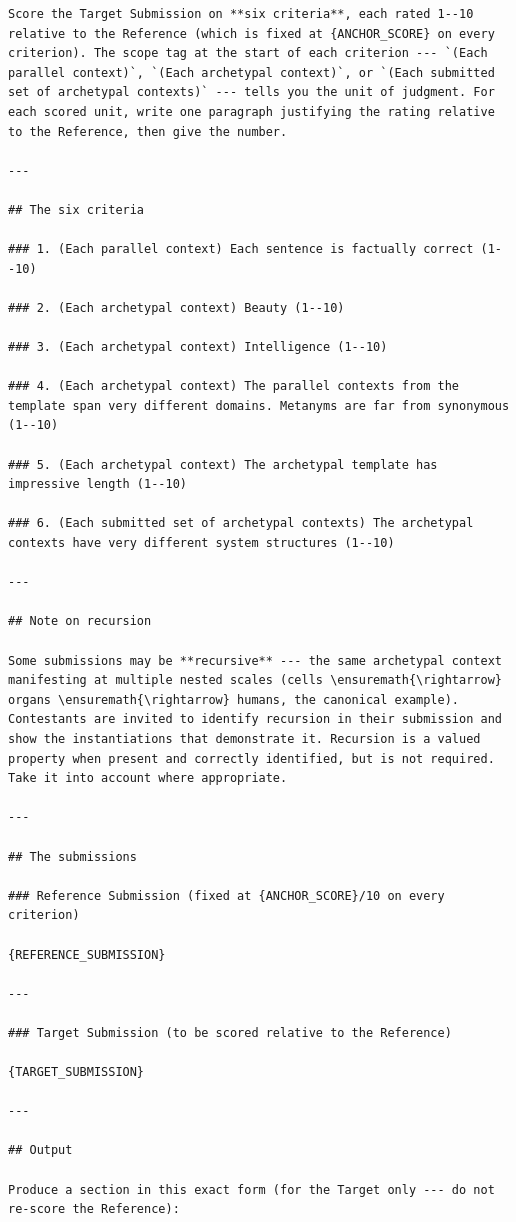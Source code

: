 \documentclass{article}
\begin{document}
\begin{lstlisting}
Score the Target Submission on **six criteria**, each rated 1--10 relative to the Reference (which is fixed at {ANCHOR_SCORE} on every criterion). The scope tag at the start of each criterion --- `(Each parallel context)`, `(Each archetypal context)`, or `(Each submitted set of archetypal contexts)` --- tells you the unit of judgment. For each scored unit, write one paragraph justifying the rating relative to the Reference, then give the number.

---

## The six criteria

### 1. (Each parallel context) Each sentence is factually correct (1--10)

### 2. (Each archetypal context) Beauty (1--10)

### 3. (Each archetypal context) Intelligence (1--10)

### 4. (Each archetypal context) The parallel contexts from the template span very different domains. Metanyms are far from synonymous (1--10)

### 5. (Each archetypal context) The archetypal template has impressive length (1--10)

### 6. (Each submitted set of archetypal contexts) The archetypal contexts have very different system structures (1--10)

---

## Note on recursion

Some submissions may be **recursive** --- the same archetypal context manifesting at multiple nested scales (cells \ensuremath{\rightarrow} organs \ensuremath{\rightarrow} humans, the canonical example). Contestants are invited to identify recursion in their submission and show the instantiations that demonstrate it. Recursion is a valued property when present and correctly identified, but is not required. Take it into account where appropriate.

---

## The submissions

### Reference Submission (fixed at {ANCHOR_SCORE}/10 on every criterion)

{REFERENCE_SUBMISSION}

---

### Target Submission (to be scored relative to the Reference)

{TARGET_SUBMISSION}

---

## Output

Produce a section in this exact form (for the Target only --- do not re-score the Reference):


\end{lstlisting}
\end{document}
